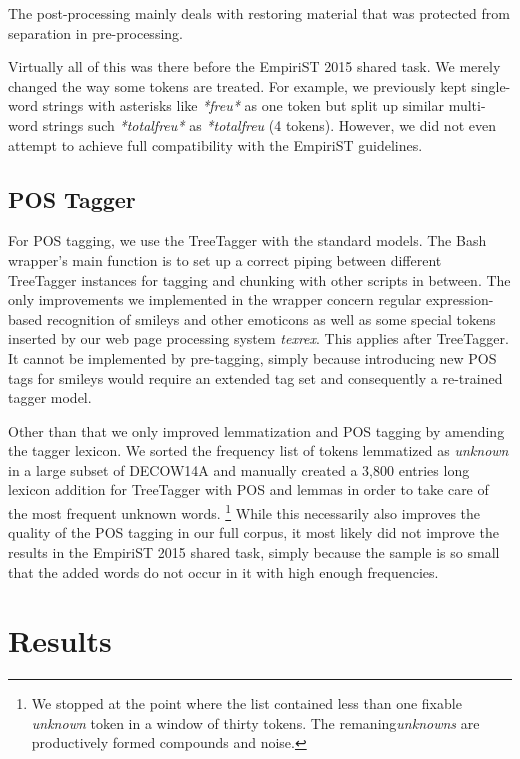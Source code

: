 \documentclass[11pt]{article}
\begin{document}
The post-processing mainly deals with restoring material that was protected from separation in pre-processing.

Virtually all of this was there before the EmpiriST 2015 shared task.
We merely changed the way some tokens are treated.
For example, we previously kept single-word strings with asterisks like \textit{*freu*} as one token but split up similar multi-word strings such \textit{*total\textvisiblespace freu*} as \textit{*\textvisiblespace total\textvisiblespace freu\textvisiblespace *} (4 tokens).
However, we did not even attempt to achieve full compatibility with the EmpiriST guidelines.

\subsection{POS Tagger}
\label{sec:postagger}

For POS tagging, we use the TreeTagger \cite{Schmid1994b,Schmid1995} with the standard models.
The Bash wrapper's main function is to set up a correct piping between different TreeTagger instances for tagging and chunking with other scripts in between.
The only improvements we implemented in the wrapper concern regular expression-based recognition of smileys and other emoticons as well as some special tokens inserted by our web page processing system \textit{texrex}.
This applies after TreeTagger.
It cannot be implemented by pre-tagging, simply because introducing new POS tags for smileys would require an extended tag set and consequently a re-trained tagger model.

Other than that we only improved lemmatization and POS tagging by amending the tagger lexicon.
We sorted the frequency list of tokens lemmatized as \textit{unknown} in a large subset of DECOW14A and manually created a 3,800 entries long lexicon addition for TreeTagger with POS and lemmas in order to take care of the most frequent unknown words.%
\footnote{We stopped at the point where the list contained less than one fixable \textit{unknown} token in a window of thirty tokens.
The remaning\textit{unknowns} are productively formed compounds and noise.}
While this necessarily also improves the quality of the POS tagging in our full corpus, it most likely did not improve the results in the EmpiriST 2015 shared task, simply because the sample is so small that the added words do not occur in it with high enough frequencies.

\section{Results}
\label{sec:results}
\end{document}
